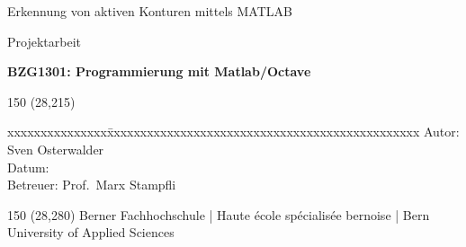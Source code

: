 \begin{titlepage}
\begin{flushleft}

\vspace*{120mm}

\fontsize{26pt}{28pt}\selectfont
Erkennung von aktiven Konturen mittels MATLAB
\vspace{3mm}

\fontsize{20pt}{22pt}\selectfont
Projektarbeit
\vspace{3mm}

\fontsize{10pt}{12pt}\selectfont
\textbf{BZG1301: Programmierung mit Matlab/Octave} \\
\vspace{3mm}

\begin{textblock}{150} (28,215)
\fontsize{10pt}{17pt}\selectfont
\begin{tabbing}
xxxxxxxxxxxxxxx\=xxxxxxxxxxxxxxxxxxxxxxxxxxxxxxxxxxxxxxxxxxxxxxx \kill
Autor:        \> Sven Osterwalder\protect\footnotemark[2]\\
Datum:        \> \versiondate\\
Betreuer:     \> Prof.\ Marx Stampfli\protect\footnotemark[3]\\
\end{tabbing}
\end{textblock}
\end{flushleft}

\begin{textblock}{150} (28,280)
\noindent 
\color{bfhgrey}\fontsize{9pt}{10pt}\selectfont
Berner Fachhochschule | Haute école spécialisée bernoise | Bern University of Applied Sciences
\color{black}\selectfont
\end{textblock}


\end{titlepage}
